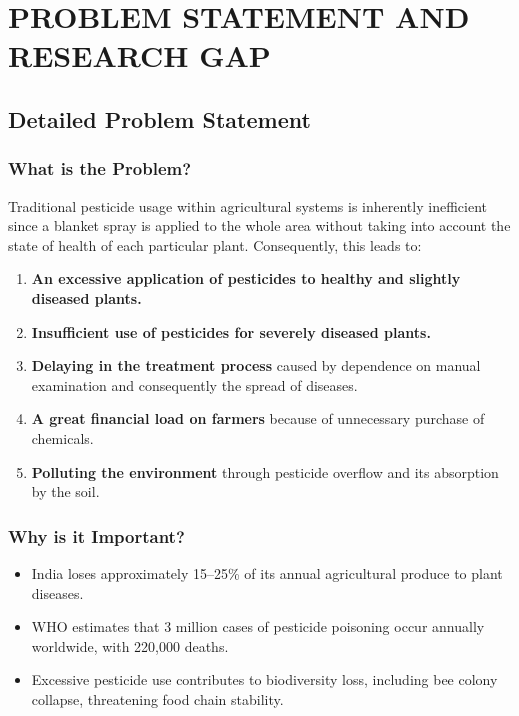 \documentclass[12pt,a4paper,oneside]{report}
\begin{document}
\chapter{PROBLEM STATEMENT AND RESEARCH GAP}

\section{Detailed Problem Statement}

\subsection{What is the Problem?}

Traditional pesticide usage within agricultural systems is inherently inefficient since a blanket spray is applied to the whole area without taking into account the state of health of each particular plant. Consequently, this leads to:

\begin{enumerate}[label=,itemindent=\parindent,leftmargin=3.5em]
\item \textbf{An excessive application of pesticides to healthy and slightly diseased plants.}
\item \textbf{Insufficient use of pesticides for severely diseased plants.}
\item \textbf{Delaying in the treatment process} caused by dependence on manual examination and consequently the spread of diseases. 
\item \textbf{A great financial load on farmers} because of unnecessary purchase of chemicals.
\item \textbf{Polluting the environment} through pesticide overflow and its absorption by the soil. 
\end{enumerate}


\subsection{Why is it Important?}

\begin{itemize}[leftmargin=2em]
    \item India loses approximately 15--25\% of its annual agricultural produce to plant diseases.
    \item WHO estimates that 3 million cases of pesticide poisoning occur annually worldwide, with 220,000 deaths.
    \item Excessive pesticide use contributes to biodiversity loss, including bee colony collapse, threatening food chain stability.
\end{itemize}
\end{document}
